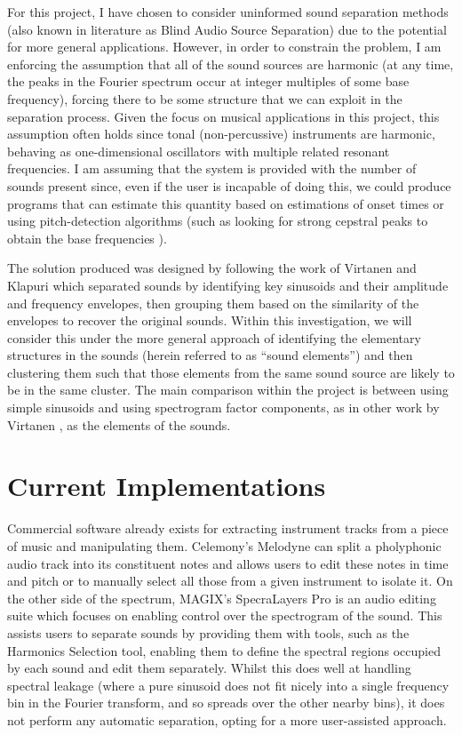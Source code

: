 \documentclass[12pt,a4paper,twoside,openright]{report}
\begin{document}
For this project, I have chosen to consider uninformed sound separation methods (also known in literature as Blind Audio Source Separation) due to the potential for more general applications. However, in order to constrain the problem, I am enforcing the assumption that all of the sound sources are harmonic (at any time, the peaks in the Fourier spectrum occur at integer multiples of some base frequency), forcing there to be some structure that we can exploit in the separation process. Given the focus on musical applications in this project, this assumption often holds since tonal (non-percussive) instruments are harmonic, behaving as one-dimensional oscillators with multiple related resonant frequencies. I am assuming that the system is provided with the number of sounds present since, even if the user is incapable of doing this, we could produce programs that can estimate this quantity based on estimations of onset times or using pitch-detection algorithms (such as looking for strong cepstral peaks to obtain the base frequencies \cite{noll1967cepstrum}).

The solution produced was designed by following the work of Virtanen and Klapuri \cite{virtanen2000separation} which separated sounds by identifying key sinusoids and their amplitude and frequency envelopes, then grouping them based on the similarity of the envelopes to recover the original sounds. Within this investigation, we will consider this under the more general approach of identifying the elementary structures in the sounds (herein referred to as ``sound elements'') and then clustering them such that those elements from the same sound source are likely to be in the same cluster. The main comparison within the project is between using simple sinusoids and using spectrogram factor components, as in other work by Virtanen \cite{virtanen2003sound}, as the elements of the sounds.

\section{Current Implementations}

Commercial software already exists for extracting instrument tracks from a piece of music and manipulating them. Celemony's Melodyne \cite{melodyne} can split a pholyphonic audio track into its constituent notes and allows users to edit these notes in time and pitch or to manually select all those from a given instrument to isolate it. On the other side of the spectrum, MAGIX's SpecraLayers Pro \cite{spatralayers} is an audio editing suite which focuses on enabling control over the spectrogram of the sound. This assists users to separate sounds by providing them with tools, such as the Harmonics Selection tool, enabling them to define the spectral regions occupied by each sound and edit them separately. Whilst this does well at handling spectral leakage (where a pure sinusoid does not fit nicely into a single frequency bin in the Fourier transform, and so spreads over the other nearby bins), it does not perform any automatic separation, opting for a more user-assisted approach.
\end{document}
